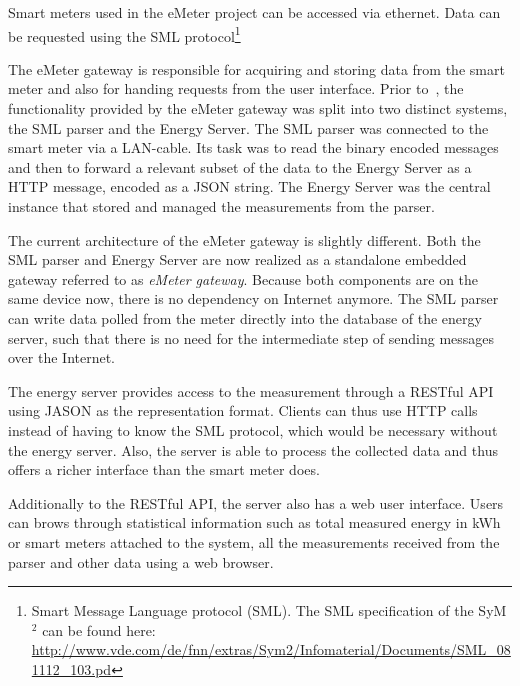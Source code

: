 Smart meters used in the eMeter project can be accessed via ethernet. Data can be requested using the SML protocol\footnote{Smart Message Language protocol (SML). The SML specification of the SyM$^2$ can be found here: \url{http://www.vde.com/de/fnn/extras/Sym2/Infomaterial/Documents/SML_081112_103.pd}} 

The eMeter gateway is responsible for acquiring and storing data from the smart meter and also for handing requests from the user interface.  
Prior to~\cite{embedded_gateway}, the functionality provided by the eMeter gateway was split into two distinct systems, the SML parser and the Energy Server. 
The SML parser was connected to the smart meter via a LAN-cable. Its task was to read the binary encoded messages and then to forward a relevant subset of the data to the Energy Server as a HTTP message, encoded as a JSON string. The Energy Server was the central instance that stored and managed the measurements from the parser. 

The current architecture of the eMeter gateway is slightly different. Both the SML parser and Energy Server are now realized as a standalone embedded gateway referred to as \textit{eMeter gateway}.
Because both components are on the same device now, there is no dependency on Internet anymore. The SML parser can write data polled from the meter directly into the database of the energy server, such that there is no need for the intermediate step of sending messages over the Internet. 

The energy server provides access to the measurement through a RESTful API using JASON as the representation format. Clients can thus use HTTP calls instead of having to know the SML protocol, which would be necessary without the energy server. Also, the server is able to process the collected data and thus offers a richer interface than the smart meter does. 

Additionally to the RESTful API, the server also has a web user interface. Users can brows through statistical information such as total measured energy in kWh or smart meters attached to the system, all the measurements received from the parser and other data using a web browser.

